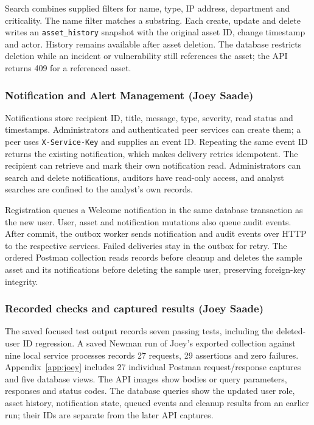 Search combines supplied filters for name, type, IP address, department and criticality. The name filter matches a substring. Each create, update and delete writes an \texttt{asset\_history} snapshot with the original asset ID, change timestamp and actor. History remains available after asset deletion. The database restricts deletion while an incident or vulnerability still references the asset; the API returns 409 for a referenced asset.

\subsubsection{Notification and Alert Management (Joey Saade)}

Notifications store recipient ID, title, message, type, severity, read status and timestamps. Administrators and authenticated peer services can create them; a peer uses \texttt{X-Service-Key} and supplies an event ID. Repeating the same event ID returns the existing notification, which makes delivery retries idempotent. The recipient can retrieve and mark their own notification read. Administrators can search and delete notifications, auditors have read-only access, and analyst searches are confined to the analyst's own records.

Registration queues a Welcome notification in the same database transaction as the new user. User, asset and notification mutations also queue audit events. After commit, the outbox worker sends notification and audit events over HTTP to the respective services. Failed deliveries stay in the outbox for retry. The ordered Postman collection reads records before cleanup and deletes the sample asset and its notifications before deleting the sample user, preserving foreign-key integrity.

\subsubsection{Recorded checks and captured results (Joey Saade)}

The saved focused test output records seven passing tests, including the deleted-user ID regression. A saved Newman run of Joey's exported collection against nine local service processes records 27 requests, 29 assertions and zero failures. Appendix~\ref{app:joey} includes 27 individual Postman request/response captures and five database views. The API images show bodies or query parameters, responses and status codes. The database queries show the updated user role, asset history, notification state, queued events and cleanup results from an earlier run; their IDs are separate from the later API captures.
